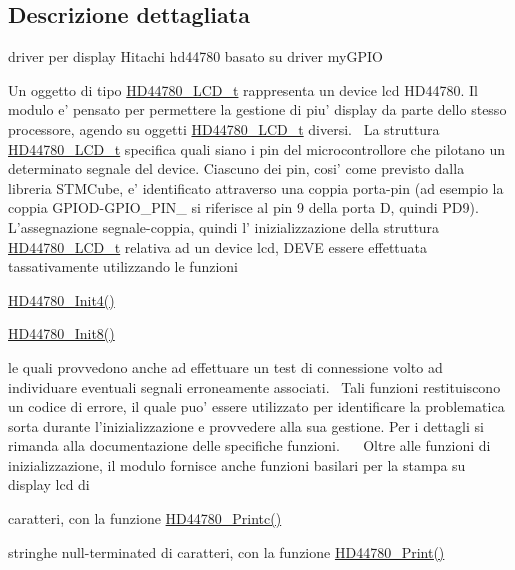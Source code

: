 \subsection{Descrizione dettagliata}
driver per display Hitachi hd44780 basato su driver my\+G\+P\+I\+O 

Un oggetto di tipo \hyperlink{struct_h_d44780___l_c_d__t}{H\+D44780\+\_\+\+L\+C\+D\+\_\+t} rappresenta un device lcd H\+D44780. Il modulo e' pensato per permettere la gestione di piu' display da parte dello stesso processore, agendo su oggetti \hyperlink{struct_h_d44780___l_c_d__t}{H\+D44780\+\_\+\+L\+C\+D\+\_\+t} diversi.~\newline
 La struttura \hyperlink{struct_h_d44780___l_c_d__t}{H\+D44780\+\_\+\+L\+C\+D\+\_\+t} specifica quali siano i pin del microcontrollore che pilotano un determinato segnale del device. Ciascuno dei pin, cosi' come previsto dalla libreria S\+T\+M\+Cube, e' identificato attraverso una coppia porta-\/pin (ad esempio la coppia G\+P\+I\+O\+D-\/\+G\+P\+I\+O\+\_\+\+P\+I\+N\+\_ si riferisce al pin 9 della porta D, quindi P\+D9). L'assegnazione segnale-\/coppia, quindi l' inizializzazione della struttura \hyperlink{struct_h_d44780___l_c_d__t}{H\+D44780\+\_\+\+L\+C\+D\+\_\+t} relativa ad un device lcd, D\+E\+V\+E essere effettuata tassativamente utilizzando le funzioni~\newline

\begin{DoxyItemize}
\item \hyperlink{group___h_d44780_ga0c08f9e41d770ebfa4af385a56b47b81}{H\+D44780\+\_\+\+Init4()}
\item \hyperlink{group___h_d44780_gad212907e20316f4fc0e93d7c7a8f338e}{H\+D44780\+\_\+\+Init8()}~\newline

\end{DoxyItemize}

le quali provvedono anche ad effettuare un test di connessione volto ad individuare eventuali segnali erroneamente associati.~\newline
 Tali funzioni restituiscono un codice di errore, il quale puo' essere utilizzato per identificare la problematica sorta durante l'inizializzazione e provvedere alla sua gestione. Per i dettagli si rimanda alla documentazione delle specifiche funzioni.~\newline
 ~\newline
 Oltre alle funzioni di inizializzazione, il modulo fornisce anche funzioni basilari per la stampa su display lcd di
\begin{DoxyItemize}
\item caratteri, con la funzione \hyperlink{group___h_d44780_ga57b8c6ca0b3c12e5f7273b3c373a6f17}{H\+D44780\+\_\+\+Printc()}
\item stringhe null-\/terminated di caratteri, con la funzione \hyperlink{group___h_d44780_ga3aedff8e2040e62db569fde955d3987b}{H\+D44780\+\_\+\+Print()}~\newline

\end{DoxyItemize}

